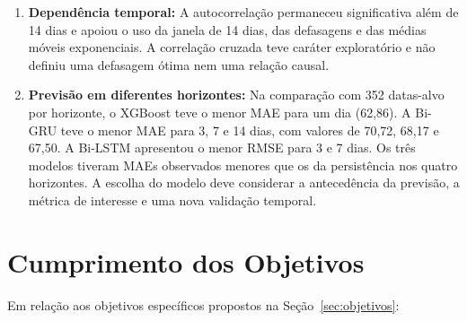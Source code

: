 \begin{enumerate}
    \item \textbf{Dependência temporal:} A autocorrelação permaneceu significativa além de 14 dias e apoiou o uso da janela de 14 dias, das defasagens e das médias móveis exponenciais. A correlação cruzada teve caráter exploratório e não definiu uma defasagem ótima nem uma relação causal.

    \item \textbf{Previsão em diferentes horizontes:} Na comparação com 352 datas-alvo por horizonte, o XGBoost teve o menor MAE para um dia (62,86). A Bi-GRU teve o menor MAE para 3, 7 e 14 dias, com valores de 70,72, 68,17 e 67,50. A Bi-LSTM apresentou o menor RMSE para 3 e 7 dias. Os três modelos tiveram MAEs observados menores que os da persistência nos quatro horizontes. A escolha do modelo deve considerar a antecedência da previsão, a métrica de interesse e uma nova validação temporal.
\end{enumerate}

\section{Cumprimento dos Objetivos}

Em relação aos objetivos específicos propostos na Seção~\ref{sec:objetivos}:


